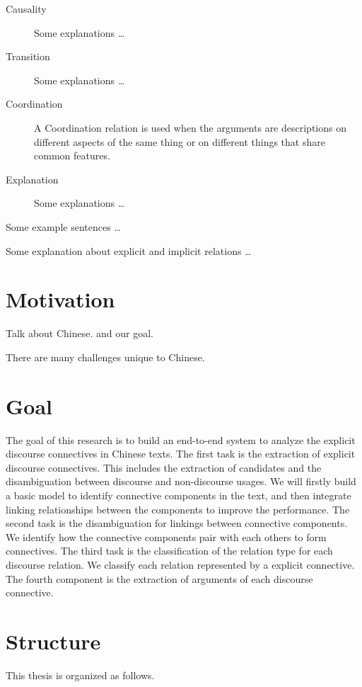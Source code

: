 \begin{description}
\item[Causality] Some explanations \ldots
\item[Transition] Some explanations \ldots
\item[Coordination] A Coordination relation is used when the arguments are
    descriptions on different aspects of the same thing or
    on different things that share common features.
\item[Explanation] Some explanations \ldots
\end{description}

Some example sentences \ldots

Some explanation about explicit and implicit relations \ldots



%
%
\section{Motivation}

Talk about Chinese. and our goal.

There are many challenges unique to Chinese.


%
%
\section{Goal}

The goal of this research is to build an end-to-end system to analyze the explicit discourse
connectives in Chinese texts. The first task is the extraction of explicit discourse
connectives. This includes the extraction of candidates and the disambiguation between discourse
and non-discourse usages. We will firstly build a basic model to identify connective components
in the text, and then integrate linking relationships between the components to improve
the performance. The second task is the disambiguation for linkings between connective components.
We identify how the connective components pair with each others to form connectives.
The third task is the classification of the relation type for each discourse relation. We classify
each relation represented by a explicit connective.
The fourth component is the extraction of arguments of each discourse connective.

%
%
\section{Structure}
This thesis is organized as follows.
